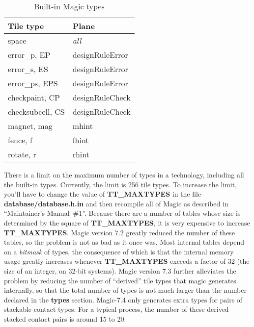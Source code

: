 \documentclass[letterpaper,twoside,12pt]{article}
\begin{document}
\begin{table}[ht]
   \begin{center}
      \begin{tabular}{|l|l|} \hline
	  Tile type 		& Plane \\ \hline\hline
	  space			& {\itshape all} \\
	  error{\_}p, EP	& designRuleError \\
	  error{\_}s, ES	& designRuleError \\
	  error{\_}ps, EPS	& designRuleError \\
	  checkpaint, CP	& designRuleCheck \\
	  checksubcell, CS	& designRuleCheck \\
	  magnet, mag		& mhint \\
	  fence, f		& fhint \\
	  rotate, r		& rhint \\ \hline
      \end{tabular}
      \caption{Built-in Magic types}
      \label{builtins}
   \end{center}
\end{table}

There is a limit on the maximum number of types in a technology, including
all the built-in types.  Currently, the limit is 256 tile types.
To increase the limit, you'll have to
change the value of {\bfseries TT{\_}MAXTYPES} in the file
{\bfseries database/database.h.in} and then recompile all
of Magic as described in ``Maintainer's Manual\ \#1''.
Because there are a number of tables whose size is determined by
the square of {\bfseries TT{\_}MAXTYPES}, it is very expensive to increase
{\bfseries TT{\_}MAXTYPES}.  Magic version 7.2 greatly reduced the
number of these tables, so the problem is not as bad as it once was.
Most internal tables depend on a {\itshape bitmask} of types, the
consequence of which is that the internal memory usage greatly
increases whenever {\bfseries TT{\_}MAXTYPES} exceeds a
factor of 32 (the size of an integer, on 32-bit systems).
Magic version 7.3 further alleviates the problem by reducing the
number of ``derived'' tile types that magic generates internally,
so that the total number of types is not much larger than the number
declared in the {\bfseries types} section.  Magic-7.4 only generates
extra types for pairs of stackable contact types.  For a typical
process, the number of these derived stacked contact pairs is
around 15 to 20.
\end{document}
